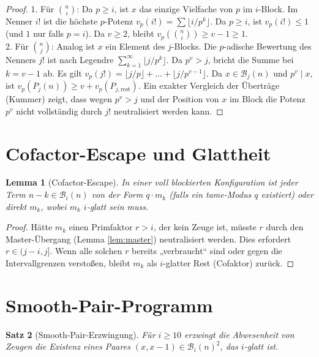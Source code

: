 \documentclass[12pt,a4paper]{article}
\theoremstyle{plain}
\newtheorem{theorem}{Satz}[section]
\newtheorem{lemma}[theorem]{Lemma}
\theoremstyle{definition}
\theoremstyle{remark}
\begin{document}
	\begin{proof}
		1. Für $\binom{n}{i}$: Da $p \ge i$, ist $x$ das einzige Vielfache von $p$ im $i$-Block. Im Nenner $i!$ ist die höchste $p$-Potenz $v_p(i!) = \sum \lfloor i/p^k \rfloor$. Da $p \ge i$, ist $v_p(i!) \le 1$ (und $1$ nur falls $p=i$). Da $v \ge 2$, bleibt $v_p(\binom{n}{i}) \ge v-1 \ge 1$. \\
		2. Für $\binom{n}{j}$: Analog ist $x$ ein Element des $j$-Blocks. Die $p$-adische Bewertung des Nenners $j!$ ist nach Legendre $\sum_{k=1}^{\infty} \lfloor j/p^k \rfloor$. Da $p^v > j$, bricht die Summe bei $k=v-1$ ab. Es gilt $v_p(j!) = \lfloor j/p \rfloor + \dots + \lfloor j/p^{v-1} \rfloor$. Da $x \in \mathcal B_j(n)$ und $p^v \mid x$, ist $v_p(P_j(n)) \ge v + v_p(P_{j, \text{rest}})$. Ein exakter Vergleich der Überträge (Kummer) zeigt, dass wegen $p^v > j$ und der Position von $x$ im Block die Potenz $p^v$ nicht vollständig durch $j!$ neutralisiert werden kann.
	\end{proof}
	
	\section{Cofactor-Escape und Glattheit}
	
	\begin{lemma}[Cofactor-Escape]
		\label{lem:cofactor-escape}
		In einer voll blockierten Konfiguration ist jeder Term $n-k \in \mathcal B_i(n)$ von der Form $q \cdot m_k$ (falls ein tame-Modus $q$ existiert) oder direkt $m_k$, wobei $m_k$ $i$-glatt sein muss.
	\end{lemma}
	
	\begin{proof}
		Hätte $m_k$ einen Primfaktor $r > i$, der kein Zeuge ist, müsste $r$ durch den Master-Übergang (Lemma \ref{lem:master}) neutralisiert werden. Dies erfordert $r \in (j-i, j]$. Wenn alle solchen $r$ bereits „verbraucht“ sind oder gegen die Intervallgrenzen verstoßen, bleibt $m_k$ als $i$-glatter Rest (Cofaktor) zurück.
	\end{proof}
	
	\section{Smooth-Pair-Programm}
	
	\begin{theorem}[Smooth-Pair-Erzwingung]
		Für $i \ge 10$ erzwingt die Abwesenheit von Zeugen die Existenz eines Paares $(x, x-1) \in \mathcal B_i(n)^2$, das $i$-glatt ist.
	\end{theorem}
	
\end{document}
